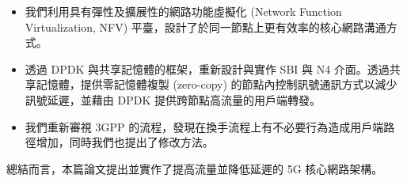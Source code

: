 \begin{itemize}
\item 我們利用具有彈性及擴展性的網路功能虛擬化 (Network Function Virtualization, NFV) 平臺，設計了於同一節點上更有效率的核心網路溝通方式。
\item 透過 DPDK 與共享記憶體的框架，重新設計與實作 SBI 與 N4 介面。透過共享記憶體，提供零記憶體複製 (zero-copy) 的節點內控制訊號通訊方式以減少訊號延遲，並藉由 DPDK 提供跨節點高流量的用戶端轉發。
\item 我們重新審視 3GPP 的流程，發現在換手流程上有不必要行為造成用戶端路徑增加，同時我們也提出了修改方法。
\end{itemize}

總結而言，本篇論文提出並實作了提高流量並降低延遲的 5G 核心網路架構。
